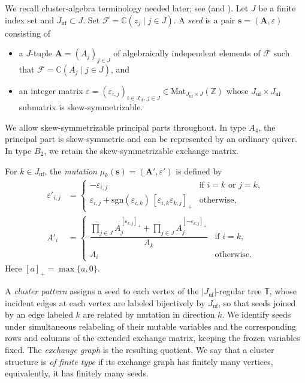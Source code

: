 \documentclass[10pt]{amsart}
\numberwithin{equation}{section}
\newcommand{\C}{{\mathbb{C}}}
\newcommand{\Z}{{\mathbb{Z}}}
\theoremstyle{plain}
\theoremstyle{definition}
\theoremstyle{remark}
\begin{document}
We recall cluster-algebra terminology needed later; see \cite{FZ02_I,BFZ05} (and \cite[\S3]{FujitaOya}).
Let $J$ be a finite index set and $J_{\mathrm{uf}}\subset J$.
Set $\mathcal F=\C(z_j\mid j\in J)$.
A \emph{seed} is a pair ${\bm s}=({\bm A},\varepsilon)$ consisting of
\begin{itemize}
	\item a $J$-tuple ${\bm A}=(A_j)_{j\in J}$ of algebraically independent elements of $\mathcal F$ such that $\mathcal F = \C(A_j \mid j \in J)$, and 
	\item an integer matrix $\varepsilon=(\varepsilon_{i,j})_{i\in J_{\mathrm{uf}},\,j\in J}\in \mathrm{Mat}_{J_{\mathrm{uf}}\times J}(\Z)$
	whose $J_{\mathrm{uf}}\times J_{\mathrm{uf}}$ submatrix is skew-symmetrizable.
\end{itemize}
We allow skew-symmetrizable principal parts throughout.
In type $A_4$, the principal part is skew-symmetric and
can be represented by an ordinary quiver.
In type $B_2$, we retain the skew-symmetrizable exchange
matrix. 


For $k\in J_{\mathrm{uf}}$, the \emph{mutation} $\mu_k({\bm s})=({\bm A}',\varepsilon')$ is defined by
\begin{equation}\label{eq_mutation}
	\begin{split}
		\varepsilon'_{i,j} &=
		\begin{cases}
			-\varepsilon_{i,j} & \text{if } i=k \text{ or } j=k,\\[2mm]
			\varepsilon_{i,j}+\mathrm{sgn}(\varepsilon_{i,k})\,[\varepsilon_{i,k}\varepsilon_{k,j}]_+ & \text{otherwise},
		\end{cases}\\
		A'_i &=
		\begin{cases}
			\dfrac{\prod_{j\in J}A_j^{[\varepsilon_{k,j}]_+}+\prod_{j\in J}A_j^{[-\varepsilon_{k,j}]_+}}{A_k}
			& \text{if } i=k,\\[3mm]
			A_i & \text{otherwise}.
		\end{cases}
	\end{split}
\end{equation}
Here $[a]_+=\max\{a,0\}$.



A \emph{cluster pattern} assigns a seed to each vertex of the $|J_{\mathrm{uf}}|$-regular tree $\mathbb T$, whose incident edges at each vertex are labeled bijectively by $J_{\mathrm{uf}}$, so that seeds joined by an edge labeled $k$ are related by mutation in direction $k$. 
We identify seeds under simultaneous relabeling of their mutable variables and the corresponding rows and columns of the extended exchange matrix, keeping the frozen variables fixed. The \emph{exchange graph} is the resulting quotient. 
We say that a cluster structure is \emph{of finite type} if its exchange graph has finitely many vertices, equivalently, it has finitely many seeds. 
\end{document}
